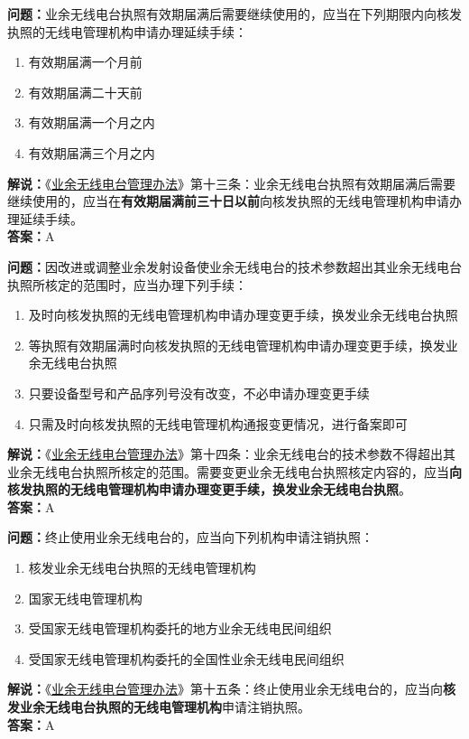 \textbf{问题：}业余无线电台执照有效期届满后需要继续使用的，应当在下列期限内向核发执照的无线电管理机构申请办理延续手续：
\begin{enumerate}[label=\Alph*), leftmargin=1cm]
	\item 有效期届满一个月前
	\item 有效期届满二十天前
	\item 有效期届满一个月之内
	\item 有效期届满三个月之内
\end{enumerate}
\textbf{解说：}《\href{https://www.miit.gov.cn/jgsj/zfs/bmgz/art/2020/art_147b69815b3641caad9047735f94c860.html}{业余无线电台管理办法}》第十三条：业余无线电台执照有效期届满后需要继续使用的，应当在\textbf{有效期届满前三十日以前}向核发执照的无线电管理机构申请办理延续手续。\\\textbf{答案：}A %

\textbf{问题：}因改进或调整业余发射设备使业余无线电台的技术参数超出其业余无线电台执照所核定的范围时，应当办理下列手续：
\begin{enumerate}[label=\Alph*), leftmargin=1cm]
	\item 及时向核发执照的无线电管理机构申请办理变更手续，换发业余无线电台执照
	\item 等执照有效期届满时向核发执照的无线电管理机构申请办理变更手续，换发业余无线电台执照
	\item 只要设备型号和产品序列号没有改变，不必申请办理变更手续
	\item 只需及时向核发执照的无线电管理机构通报变更情况，进行备案即可
\end{enumerate}
\textbf{解说：}《\href{https://www.miit.gov.cn/jgsj/zfs/bmgz/art/2020/art_147b69815b3641caad9047735f94c860.html}{业余无线电台管理办法}》第十四条：业余无线电台的技术参数不得超出其业余无线电台执照所核定的范围。需要变更业余无线电台执照核定内容的，应当\textbf{向核发执照的无线电管理机构申请办理变更手续，换发业余无线电台执照}。\\\textbf{答案：}A

\textbf{问题：}终止使用业余无线电台的，应当向下列机构申请注销执照：
\begin{enumerate}[label=\Alph*), leftmargin=1cm]
	\item 核发业余无线电台执照的无线电管理机构
	\item 国家无线电管理机构
	\item 受国家无线电管理机构委托的地方业余无线电民间组织
	\item 受国家无线电管理机构委托的全国性业余无线电民间组织
\end{enumerate}
\textbf{解说：}《\href{https://www.miit.gov.cn/jgsj/zfs/bmgz/art/2020/art_147b69815b3641caad9047735f94c860.html}{业余无线电台管理办法}》第十五条：终止使用业余无线电台的，应当向\textbf{核发业余无线电台执照的无线电管理机构}申请注销执照。\\\textbf{答案：}A

